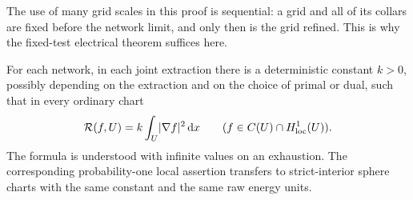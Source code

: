 The use of many grid scales in this proof is sequential: a grid and all
of its collars are fixed before the network limit, and only then is the
grid refined.  This is why the fixed-test electrical theorem suffices here.

\begin{lemma}\label{lem:energy-tensor}
For each network, in each joint extraction there is a deterministic
constant \(k>0\), possibly depending on the extraction and on the choice
of primal or dual, such that in every ordinary chart
\begin{equation}\label{eq:scalar-relaxation}
 \mathcal R(f,U)=k\int_U\lvert \nabla f\rvert^2\,\mathrm d x
 \qquad(f\in C(U)\cap H^1_{\rm loc}(U)).
\end{equation}
The formula is understood with infinite values on an exhaustion.
The corresponding probability-one local assertion transfers to
strict-interior sphere charts with the same constant and the same raw
energy units.
\end{lemma}

